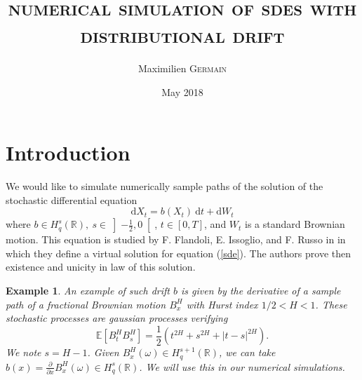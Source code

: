 \documentclass{article}[12pt]
\newcommand{\pade}[2]{\frac{\partial #1}{\partial #2}}
\newtheorem{ex}{Example}
\newcommand{\R}{\mathbb{R}}
\newcommand{\E}{\mathbb{E}}
\newcommand{\di}{\mathrm{d}}
\begin{document}
\title{\Large \textsc{\textbf{numerical simulation of sdes with distributional drift}}} \author{Maximilien \textsc{Germain} \date{May 2018}}
\maketitle

\section{Introduction}

    \paragraph{}
    We would like to simulate numerically sample paths of the solution of the stochastic differential equation
    \begin{equation} \label{sde}
    \di X_t = b(X_t)\ \di t + \di W_t
    \end{equation}
    where $b\in H^s_q(\R),\ s\in\left]-\frac{1}{2},0\right[$, $t\in[0,T]$, and $W_t$ is a standard Brownian motion. This equation is studied by F. Flandoli, E. Issoglio, and F. Russo in \cite{Fla-Iss-Rus-2017} in which they define a virtual solution for equation (\ref{sde}). The authors prove then existence and unicity in law of this solution. 
    
    \begin{ex}
        An example of such drift $b$ is given by the derivative of a sample path of a fractional Brownian motion $B^H_x$ with Hurst index $1/2<H<1$. These stochastic processes are gaussian processes verifying $$\E\left[B_t^HB_s^H\right]=\frac{1}{2}\left(t^{2H}+s^{2H}+|t-s|^{2H}\right).$$ We note $s = H - 1$. Given $B^H_x(\omega)\in H^{s+1}_q(\R)$, we can take $b(x) = \pade{}{x}B^H_x(\omega)\in H^s_q(\R)$. We will use this in our numerical simulations.
    \end{ex}    
    
\end{document}
